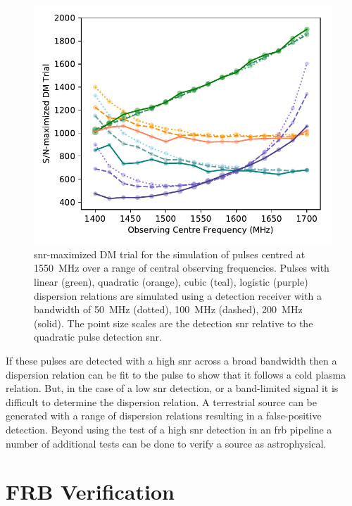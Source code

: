 \documentclass[a4paper,fleqn,usenatbib]{mnras}
\begin{document}
\begin{figure}
    \includegraphics[width=1.0\linewidth]{figures/simulatedPulseDM.pdf}
    \caption{\gls{snr}-maximized DM trial for the simulation of pulses centred
    at 1550~MHz over a range of central observing frequencies. Pulses with
    linear (green), quadratic (orange), cubic (teal), logistic (purple)
    dispersion relations are simulated using a detection receiver with a
    bandwidth of 50~MHz (dotted), 100~MHz (dashed), 200~MHz (solid). The point
    size scales are the detection \gls{snr} relative to the quadratic pulse
    detection \gls{snr}.
    }
    \label{fig:sim_snr_max_dm}
\end{figure}

If these pulses are detected with a high \gls{snr} across a broad bandwidth then
a dispersion relation can be fit to the pulse to show that it follows a cold
plasma relation. But, in the case of a low \gls{snr} detection, or a
band-limited signal it is difficult to determine the dispersion relation. A
terrestrial source can be generated with a range of dispersion relations
resulting in a false-positive detection. Beyond using the test of a high
\gls{snr} detection in an \gls{frb} pipeline a number of additional tests can be
done to verify a source as astrophysical.

\section{FRB Verification}
\label{sec:verify_crit}
\end{document}
